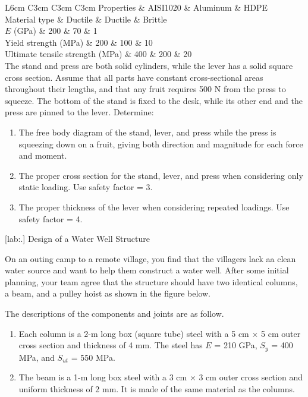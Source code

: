 \documentclass[a4paper,openany,12pt]{book}
\begin{document}
{{ L6cm C3cm C3cm C3cm Properties \& AISI1020 \& Aluminum \& HDPE\\
Material type \& Ductile \& Ductile \& Brittle\\
\(E\) (GPa) \& 200 \& 70 \& 1\\
Yield strength (MPa) \& 200 \& 100 \& 10\\
Ultimate tensile strength (MPa) \& 400 \& 200 \& 20\\

The stand and press are both solid cylinders, while the lever has a
solid square cross section. Assume that all parts have constant
cross-sectional areas throughout their lengths, and that any fruit
requires 500 N from the press to squeeze. The bottom of the stand is
fixed to the desk, while its other end and the press are pinned to the
lever. Determine:

\begin{enumerate}
\item The free body diagram of the stand, lever, and press while the press
is squeezing down on a fruit, giving both direction and magnitude for
each force and moment.

\item The proper cross section for the stand, lever, and press when
considering only static loading. Use safety factor = 3.

\item The proper thickness of the lever when considering repeated loadings.
Use safety factor = 4.
\end{enumerate}

[lab:.] Design of a Water Well
Structure

On an outing camp to a remote village, you find that the villagers lack
aa clean water source and want to help them construct a water well.
After some initial planning, your team agree that the structure should
have two identical columns, a beam, and a pulley hoist as shown in the
figure below.


The descriptions of the components and joints are as follow.

\begin{enumerate}
\item Each column is a 2-m long box (square tube) steel with a 5 cm
\(\times\) 5 cm outer cross section and thickness of 4 mm. The steel
has \(E\) = 210 GPa, \(S_y\) = 400 MPa, and \(S_{ut}\) = 550 MPa.

\item The beam is a 1-m long box steel with a 3 cm \(\times\) 3 cm outer
cross section and uniform thickness of 2 mm. It is made of the same
material as the columns.
\end{enumerate}


}}
\end{document}
